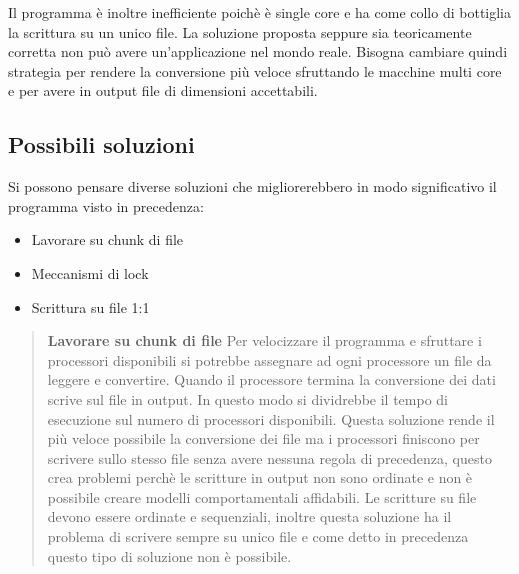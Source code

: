 \documentclass[../main.tex]{subfiles}
\begin{document}
Il programma è inoltre inefficiente poichè è single core e ha come collo di bottiglia la scrittura su un unico file. 
La soluzione proposta seppure sia teoricamente corretta non può avere un'applicazione nel mondo reale. Bisogna cambiare quindi strategia per rendere la conversione più veloce sfruttando le macchine multi core e per avere in output file di dimensioni accettabili.

\subsection{Possibili soluzioni}
Si possono pensare diverse soluzioni che migliorerebbero in modo significativo il programma visto in precedenza:

\begin{itemize}
				\item Lavorare su chunk di file
				\item Meccanismi di lock
				\item Scrittura su file 1:1
\end{itemize}

\begin{verse}
\textbf{Lavorare su chunk di file}
Per velocizzare il programma e sfruttare i processori disponibili si potrebbe assegnare ad ogni processore un file da leggere e convertire. Quando il processore termina la conversione dei dati scrive sul file in output. In questo modo si dividrebbe il tempo di esecuzione sul numero di processori disponibili. 
Questa soluzione rende il più veloce possibile la conversione dei file ma i processori finiscono per scrivere sullo stesso file senza avere nessuna regola di precedenza, questo crea problemi perchè le scritture in output non sono ordinate e non è possibile creare modelli comportamentali affidabili. Le scritture su file devono essere ordinate e sequenziali, inoltre questa soluzione ha il problema di scrivere sempre su unico file e come detto in precedenza questo tipo di soluzione non è possibile.
\end{verse}
\end{document}
